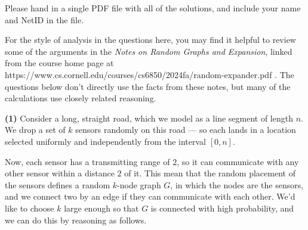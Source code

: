 \documentclass[12pt]{article}
\begin{document}
\setlength{\fboxrule}{.5mm}\setlength{\fboxsep}{1.2mm}
\newlength{\boxlength}\setlength{\boxlength}{\textwidth}
\addtolength{\boxlength}{-4mm}
\begin{center}\end{center}
\vspace{5mm}

\def\ind{\hspace*{0.3in}}
\def\gap{\vskip 0.2in}
\def\rs{\vspace*{-0.0in}}
\newcommand{\Xomit}[1]{}
\newcommand{\cel}[1]{ {\lceil {#1} \rceil} }

\newcommand{\xhdr}[1]{\paragraph{{#1}.}}

\def\scenebreak{{\gap \center{\rule[.1in]{4.0in}{.01in}} \gap}}

Please hand in a single PDF file with all of the solutions,
and include your name and NetID in the file.

\medskip

For the style of analysis in the questions here,
you may find it helpful to review some of the arguments in the 
{\em Notes on Random Graphs and Expansion},
linked from the course home page at
https://www.cs.cornell.edu/courses/cs6850/2024fa/random-expander.pdf .
The questions below don't directly use the facts from these notes,
but many of the calculations use closely related reasoning.

\scenebreak

{\bf (1)} Consider a long, straight road, which we model
as a line segment of length $n$.
We drop a set of $k$ sensors randomly on this road ---
so each lands in a location selected uniformly and
independently from the interval $[0,n]$.

Now, each sensor has a transmitting range of $2$, so
it can communicate with any other sensor within a distance $2$ of it.
This mean that the random placement of the sensors
defines a random $k$-node graph $G$, in which the nodes are the sensors,
and we connect two by an edge if they can communicate with each other.
We'd like to choose $k$ large enough so that $G$ is
connected with high probability, and we can do this by reasoning as follows.
\end{document}
